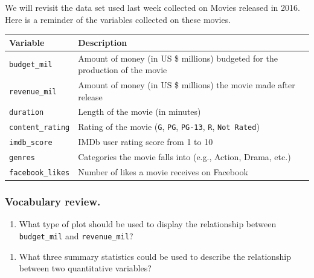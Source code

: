 \documentclass[
]{report}
\providecommand{\tightlist}{%
  \setlength{\itemsep}{0pt}\setlength{\parskip}{0pt}}
\begin{document}
We will revisit the data set used last week collected on Movies released in 2016. Here is a reminder of the variables collected on these movies.

\begin{longtable}[]{@{}
  >{\raggedright\arraybackslash}p{}
  >{\raggedright\arraybackslash}p{}@{}}
\toprule
\textbf{Variable} & \textbf{Description} \\
\midrule
\endhead
\texttt{budget\_mil} & Amount of money (in US \$ millions) budgeted for the production of the movie \\
\texttt{revenue\_mil} & Amount of money (in US \$ millions) the movie made after release \\
\texttt{duration} & Length of the movie (in minutes) \\
\texttt{content\_rating} & Rating of the movie (\texttt{G}, \texttt{PG}, \texttt{PG-13}, \texttt{R}, \texttt{Not\ Rated}) \\
\texttt{imdb\_score} & IMDb user rating score from 1 to 10 \\
\texttt{genres} & Categories the movie falls into (e.g., Action, Drama, etc.) \\
\texttt{facebook\_likes} & Number of likes a movie receives on Facebook \\
\bottomrule
\end{longtable}

\hypertarget{vocabulary-review.-1}{%
\subsubsection*{Vocabulary review.}\label{vocabulary-review.-1}}

\begin{enumerate}
\def\labelenumi{\arabic{enumi}.}
\tightlist
\item
  What type of plot should be used to display the relationship between \texttt{budget\_mil} and \texttt{revenue\_mil}?
\end{enumerate}

\vspace{0.2in}

\begin{enumerate}
\def\labelenumi{\arabic{enumi}.}
\setcounter{enumi}{1}
\tightlist
\item
  What three summary statistics could be used to describe the relationship between two quantitative variables?
\end{enumerate}
\end{document}

